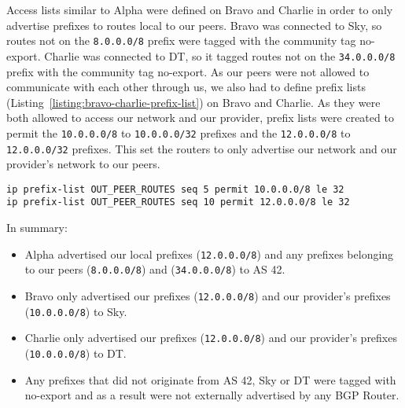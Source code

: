 Access lists similar to Alpha were defined on Bravo and Charlie in order to
only advertise prefixes to routes local to our peers. Bravo was connected to
Sky, so routes not on the \texttt{8.0.0.0/8} prefix were tagged with the
community tag no-export. Charlie was connected to DT, so it tagged routes not
on the \texttt{34.0.0.0/8} prefix with the community tag no-export. As our
peers were not allowed to communicate with each other through us, we also had
to define prefix lists (Listing~\ref{listing:bravo-charlie-prefix-list}) on Bravo and Charlie. As they were both allowed to
access our network and our provider, prefix lists were created to permit the
\texttt{10.0.0.0/8} to \texttt{10.0.0.0/32} prefixes and the
\texttt{12.0.0.0/8} to \texttt{12.0.0.0/32} prefixes. This set the routers to
only advertise our network and our provider's network to our peers.

\begin{lstlisting}[caption={Bravo and Charlie Prefix List}, label={listing:bravo-charlie-prefix-list}]
ip prefix-list OUT_PEER_ROUTES seq 5 permit 10.0.0.0/8 le 32
ip prefix-list OUT_PEER_ROUTES seq 10 permit 12.0.0.0/8 le 32
\end{lstlisting}

In summary:

\begin{itemize}
    \item Alpha advertised our local prefixes (\texttt{12.0.0.0/8}) and any prefixes belonging to our peers (\texttt{8.0.0.0/8}) and (\texttt{34.0.0.0/8}) to AS 42.

    \item Bravo only advertised our prefixes (\texttt{12.0.0.0/8}) and our provider's prefixes (\texttt{10.0.0.0/8}) to Sky.

    \item Charlie only advertised our prefixes (\texttt{12.0.0.0/8}) and our provider's prefixes (\texttt{10.0.0.0/8}) to DT.
    
    \item Any prefixes that did not originate from AS 42, Sky or DT were tagged with no-export and as a result were not externally advertised by any BGP Router.
\end{itemize}
